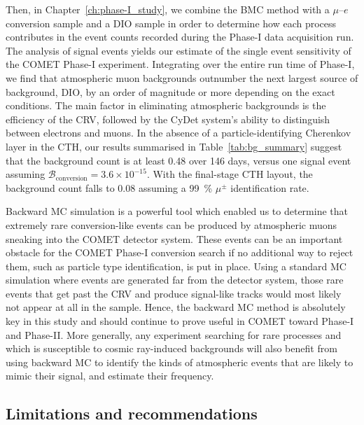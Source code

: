 Then, in Chapter~\ref{ch:phase-I_study}, we combine the BMC method with a
$\mu$--$e$ conversion sample and a DIO sample in order to determine how each
process contributes in the event counts recorded during the Phase\nobreakdash-I data
acquisition run. The analysis of signal events yields our estimate of the single
event sensitivity of the COMET Phase\nobreakdash-I experiment. Integrating over the entire
run time of Phase\nobreakdash-I, we find that atmospheric muon backgrounds outnumber the
next largest source of background, DIO, by an order of magnitude or more
depending on the exact conditions. The main factor in eliminating atmospheric
backgrounds is the efficiency of the CRV, followed by the CyDet system's ability
to distinguish between electrons and muons. In the absence of a
particle-identifying Cherenkov layer in the CTH, our results summarised in
Table~\ref{tab:bg_summary} suggest that the background count is at least 0.48
over 146 days, versus one signal event assuming $\mathcal{B}_\mathrm{conversion}
= 3.6 \times 10^{-15}$. With the final-stage CTH layout, the background count
falls to 0.08 assuming a \SI{99}{\percent} $\mu^\pm$ identification rate.


Backward MC simulation is a powerful tool which enabled us to determine that
extremely rare conversion-like events can be produced by atmospheric muons
sneaking into the COMET detector system. These events can be an important
obstacle for the COMET Phase\nobreakdash-I conversion search if no additional way to
reject them, such as particle type identification, is put in place. Using a
standard MC simulation where events are generated far from the detector system,
those rare events that get past the CRV and produce signal-like tracks would
most likely not appear at all in the sample. Hence, the backward MC method is
absolutely key in this study and should continue to prove useful in COMET toward
Phase\nobreakdash-I and Phase\nobreakdash-II. More generally, any experiment searching for rare
processes and which is susceptible to cosmic ray-induced backgrounds will also
benefit from using backward MC to identify the kinds of atmospheric events that
are likely to mimic their signal, and estimate their frequency.

\subsection{Limitations and recommendations}


